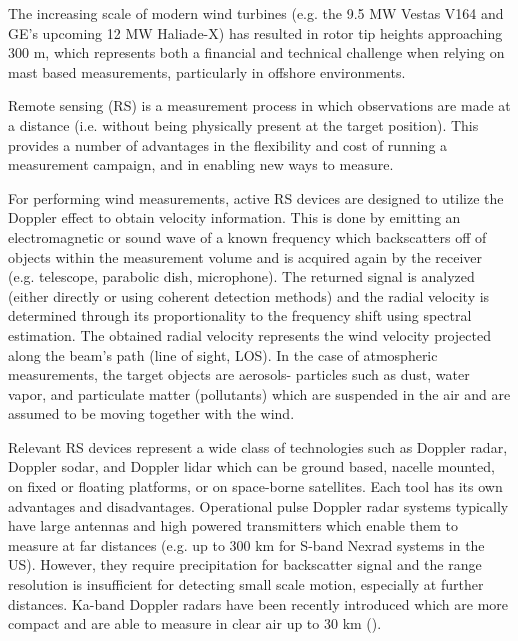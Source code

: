 The increasing scale of modern wind turbines (e.g. the 9.5 MW Vestas V164 and GE's upcoming 12 MW Haliade-X) has resulted in rotor tip heights approaching 300 m, which represents both a financial and technical challenge when relying on mast based measurements, particularly in offshore environments.

Remote sensing (RS) is a measurement process in which observations are made at a distance (i.e. without being physically present at the target position). This provides a number of advantages in the flexibility and cost of running a measurement campaign, and in enabling new ways to measure.

For performing wind measurements, active RS devices are designed to utilize the Doppler effect to obtain velocity information. This is done by emitting an electromagnetic or sound wave of a known frequency which backscatters off of objects within the measurement volume and is acquired again by the receiver (e.g. telescope, parabolic dish, microphone). The returned signal is analyzed (either directly or using coherent detection methods) and the radial velocity is determined through its proportionality to the frequency shift using spectral estimation. The obtained radial velocity represents the wind velocity projected along the beam's path (line of sight, LOS). In the case of atmospheric measurements, the target objects are aerosols- particles such as dust, water vapor, and particulate matter (pollutants) which are suspended in the air and are assumed to be moving together with the wind.


Relevant RS devices represent a wide class of technologies such as Doppler radar, Doppler sodar, and Doppler lidar which can be ground based, nacelle mounted, on fixed or floating platforms, or on space-borne satellites. Each tool has its own advantages and disadvantages. Operational pulse Doppler radar systems typically have large antennas and high powered transmitters which enable them to measure at far distances (e.g. up to 300 km for S-band Nexrad systems in the US). However, they require precipitation for backscatter signal and the range resolution is insufficient for detecting small scale motion, especially at further distances. Ka-band Doppler radars have been recently introduced which are more compact and are able to measure in clear air up to 30 km (\cite{hirth_measuring_2012}). 


